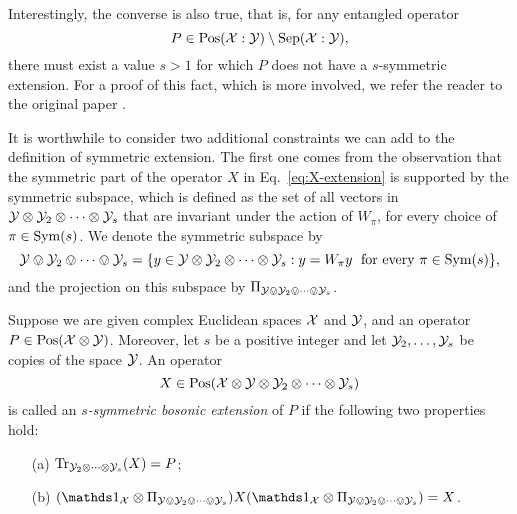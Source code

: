 Interestingly, the converse is also true, that is, for any entangled operator 
\begin{equation}
P \in \mathrm{Pos}(\mathcal{X}:\mathcal{Y}) \setminus \mathrm{Sep}(\mathcal{X}:\mathcal{Y}),
\end{equation}
there must exist a value $s > 1$ for which $P$ does not have a $s$-symmetric 
extension. For a proof of this fact, which is more involved, we refer the 
reader to the original paper \cite{Doherty02}.



It is worthwhile to consider two additional constraints we can add to the 
definition of symmetric extension. 
The first one comes from the observation that the symmetric part of the operator
$X$ in Eq.~\eqref{eq:X-extension} is supported by the symmetric subspace, which
is defined as the set of all vectors in $\mathcal{Y}\otimes\mathcal{Y}_{2}\otimes\cdots\otimes\mathcal{Y}_{s}$
that are invariant under the action of $W_{\pi}$, for every choice of $\pi\in\mathrm{Sym}(s)$.
We denote the symmetric subspace by
\begin{equation}
  \mathcal{Y}\ovee\mathcal{Y}_{2}\ovee\cdots\ovee\mathcal{Y}_{s} = \{ y \in \mathcal{Y}\otimes\mathcal{Y}_{2}\otimes\cdots\otimes\mathcal{Y}_{s}
    : y = W_{\pi}y \;\mbox{ for every $\pi\in\mathrm{Sym}(s)$} \},
\end{equation}
and the projection on this subspace by $\Pi_{\mathcal{Y}\ovee\mathcal{Y}_{2}\ovee\cdots\ovee\mathcal{Y}_{s}}$.

\begin{definition}
\label{def:bosonic}
  Suppose we are given complex Euclidean spaces $\mathcal{X}$ and $\mathcal{Y}$, and an operator
  $P\in\mathrm{Pos}(\mathcal{X}\otimes\mathcal{Y})$. Moreover, let $s$ be a positive integer and let 
  $\mathcal{Y}_{2},\ldots,\mathcal{Y}_{s}$ be copies of the space $\mathcal{Y}$. An operator 
  \begin{equation}
    X \in \mathrm{Pos}(\mathcal{X}\otimes\mathcal{Y}\otimes\mathcal{Y}_{2}\otimes\cdots\otimes\mathcal{Y}_{s})
  \end{equation}
  is called an \emph{$s$-symmetric bosonic extension} of $P$ if the following 
  two properties hold:
  \begin{itemize}
    \item[(a)] $\operatorname{Tr}_{\mathcal{Y}_{2}\otimes\cdots\otimes\mathcal{Y}_{s}}(X) = P$;
    \item[(b)] $(\I_{\X}\otimes \Pi_{\Y\ovee\Y_{2}\ovee\cdots\ovee\Y_{s}})X
                (\I_{\X}\otimes \Pi_{\Y\ovee\Y_{2}\ovee\cdots\ovee\Y_{s}}) = X$.
  \end{itemize}
\end{definition}

